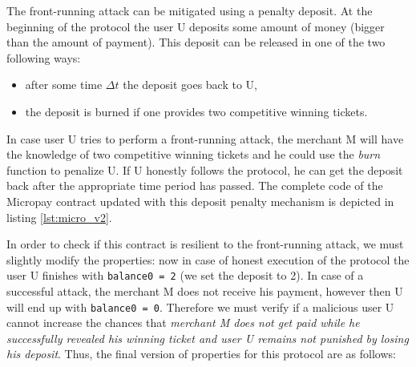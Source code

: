 The front-running attack can be mitigated using a penalty deposit.
At the beginning of the protocol the user U deposits some amount of money (bigger than the amount of payment).
This deposit can be released in one of the two following ways:
\begin{itemize}
\item after some time $\Delta t$ the deposit goes back to U,
\item the deposit is burned if one provides two competitive winning tickets.
\end{itemize}
In case user U tries to perform a front-running attack, the merchant M will have the knowledge of two 
competitive winning tickets and he could use the \emph{burn} function to penalize U.
If U honestly follows the protocol, he can get the deposit back after the appropriate time period has passed.
The complete code of the Micropay contract updated with this deposit penalty mechanism is depicted in listing
\ref{lst:micro_v2}.



In order to check if this contract is resilient to the front-running attack, we must slightly modify the properties:
now in case of honest execution of the protocol the user U finishes with \lstinline{balance0 = 2} (we set the 
deposit to 2).
In case of a successful attack, the merchant M does not receive his payment, however then U will end up 
with \lstinline{balance0 = 0}.
Therefore we must verify if a malicious user U cannot increase the chances that
\emph{merchant M does not get paid while he successfully revealed his winning ticket and user U remains
not punished by losing his deposit}.
Thus, the final version of properties for this protocol are as follows:



